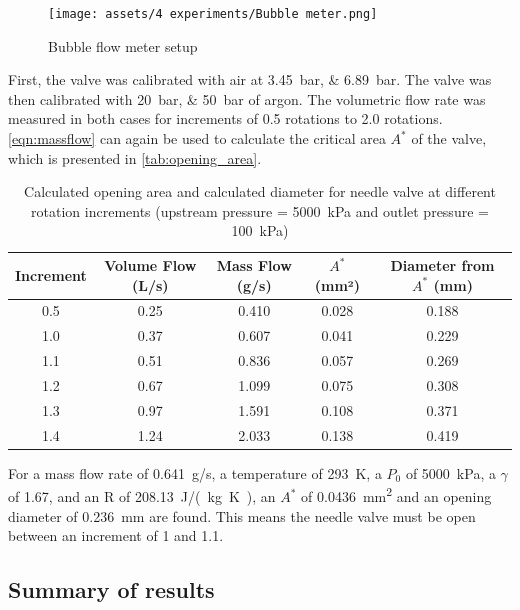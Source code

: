             \begin{figure}[!ht]
                \centering
                \texttt{[image: assets/4 experiments/Bubble meter.png]}
                \caption{Bubble flow meter setup}
                \label{fig:bubble meter}
            \end{figure}

            First, the valve was calibrated with air at \qtylist{3.45;6.89}{bar}. The valve was then calibrated with \qtylist{20;50}{bar} of argon. The volumetric flow rate was measured in both cases for increments of 0.5 rotations to 2.0 rotations. \autoref{eqn:massflow} can again be used to calculate the critical area $A^*$ of the valve, which is presented in \autoref{tab:opening_area}.

            \begin{table}[!ht]
                \centering
                \caption{Calculated opening area and calculated diameter for needle valve at different rotation increments (upstream pressure = \qty{5000}{kPa} and outlet pressure = \qty{100}{kPa})}
                \label{tab:opening_area}
                \begin{tabular}{ccccc}
                \toprule
                Increment & Volume Flow (L/s) & Mass Flow (g/s) & $A^*$ (mm²) & Diameter from $A^*$ (mm) \\ \midrule
                0.5 & 0.25 & 0.410 & 0.028 & 0.188 \\
                1.0 & 0.37 & 0.607 & 0.041 & 0.229 \\
                1.1 & 0.51 & 0.836 & 0.057 & 0.269 \\
                1.2 & 0.67 & 1.099 & 0.075 & 0.308 \\
                1.3 & 0.97 & 1.591 & 0.108 & 0.371 \\
                1.4 & 1.24 & 2.033 & 0.138 & 0.419 \\
                \bottomrule
                \end{tabular}
            \end{table}

            For a mass flow rate of \qty{0.641}{g/s}, a temperature of \qty{293}{K}, a $P_0$ of \qty{5000}{kPa}, a $\gamma$ of 1.67, and an R of \qty{208.13}{J/(kg.K)}, an $A^*$ of \qty{0.0436}{mm^2} and an opening diameter of \qty{0.236}{mm} are found. This means the needle valve must be open between an increment of 1 and 1.1.

        \subsection{Summary of results}

